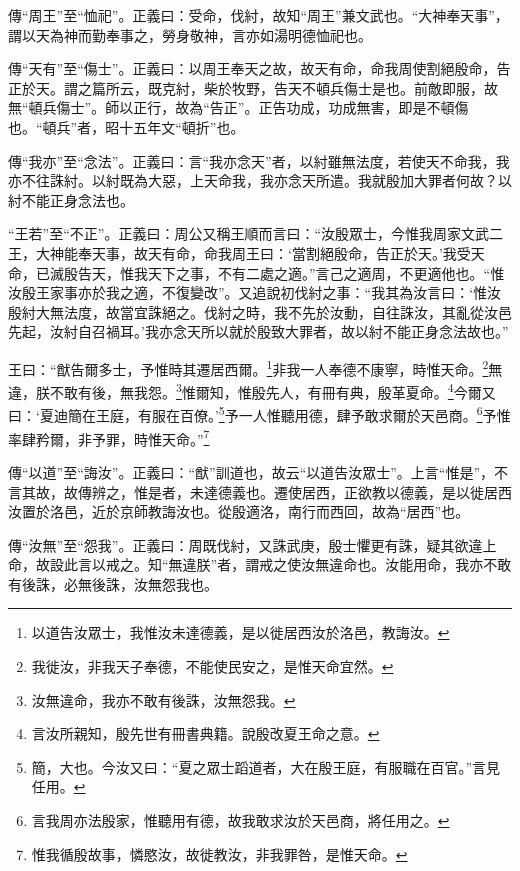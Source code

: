 {\noindent\zhuan{}\fzbyks 傳“周王”至“恤祀”。正義曰：受命，伐紂，故知“周王”兼文武也。“大神奉天事”，謂以天為神而勤奉事之，勞身敬神，言亦如湯明德恤祀也。 \par}

{\noindent\zhuan{}\fzbyks 傳“天有”至“傷士”。正義曰：以周王奉天之故，故天有命，命我周使割絕殷命，告正於天。謂之篇所云，既克紂，柴於牧野，告天不頓兵傷士是也。前敵即服，故無“頓兵傷士”。師以正行，故為“告正”。正告功成，功成無害，即是不頓傷也。“頓兵”者，昭十五年文“頓折”也。 \par}

{\noindent\zhuan{}\fzbyks 傳“我亦”至“念法”。正義曰：言“我亦念天”者，以紂雖無法度，若使天不命我，我亦不往誅紂。以紂既為大惡，上天命我，我亦念天所遣。我就殷加大罪者何故？以紂不能正身念法也。 \par}

{\noindent\shu{}\fzkt “王若”至“不正”。正義曰：周公又稱王順而言曰：“汝殷眾士，今惟我周家文武二王，大神能奉天事，故天有命，命我周王曰：‘當割絕殷命，告正於天。’我受天命，已滅殷告天，惟我天下之事，不有二處之適。”言己之適周，不更適他也。“惟汝殷王家事亦於我之適，不復變改”。又追說初伐紂之事：“我其為汝言曰：‘惟汝殷紂大無法度，故當宜誅絕之。伐紂之時，我不先於汝動，自往誅汝，其亂從汝邑先起，汝紂自召禍耳。’我亦念天所以就於殷致大罪者，故以紂不能正身念法故也。” \par}

王曰：“猷告爾多士，予惟時其遷居西爾。\footnote{以道告汝眾士，我惟汝未達德義，是以徙居西汝於洛邑，教誨汝。}非我一人奉德不康寧，時惟天命。\footnote{我徙汝，非我天子奉德，不能使民安之，是惟天命宜然。}無違，朕不敢有後，無我怨。\footnote{汝無違命，我亦不敢有後誅，汝無怨我。}惟爾知，惟殷先人，有冊有典，殷革夏命。\footnote{言汝所親知，殷先世有冊書典籍。說殷改夏王命之意。}今爾又曰：‘夏迪簡在王庭，有服在百僚。’\footnote{簡，大也。今汝又曰：“夏之眾士蹈道者，大在殷王庭，有服職在百官。”言見任用。}予一人惟聽用德，肆予敢求爾於天邑商。\footnote{言我周亦法殷家，惟聽用有德，故我敢求汝於天邑商，將任用之。}予惟率肆矜爾，非予罪，時惟天命。”\footnote{惟我循殷故事，憐愍汝，故徙教汝，非我罪咎，是惟天命。}

{\noindent\zhuan{}\fzbyks 傳“以道”至“誨汝”。正義曰：“猷”訓道也，故云“以道告汝眾士”。上言“惟是”，不言其故，故傳辨之，惟是者，未達德義也。遷使居西，正欲教以德義，是以徙居西汝置於洛邑，近於京師教誨汝也。從殷適洛，南行而西回，故為“居西”也。 \par}

{\noindent\zhuan{}\fzbyks 傳“汝無”至“怨我”。正義曰：周既伐紂，又誅武庚，殷士懼更有誅，疑其欲違上命，故設此言以戒之。知“無違朕”者，謂戒之使汝無違命也。汝能用命，我亦不敢有後誅，必無後誅，汝無怨我也。 \par}

